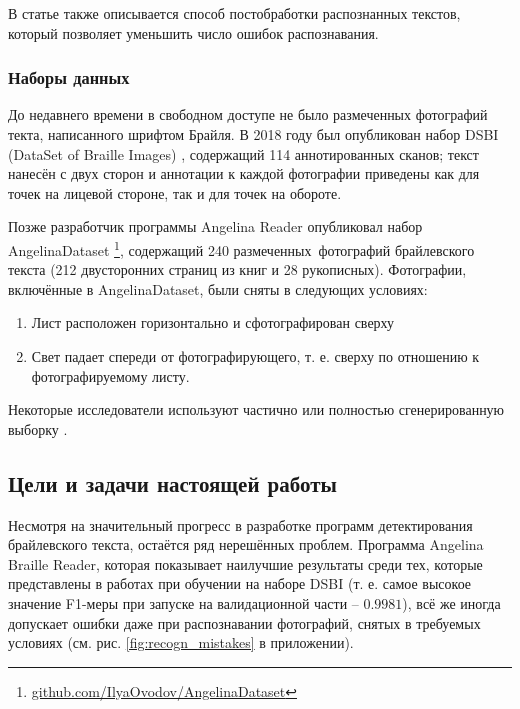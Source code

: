 \documentclass{main.tex}[subfiles]
\begin{document}
В статье \cite{ortoncelli2021} также описывается способ постобработки распознанных текстов, который позволяет уменьшить число ошибок распознавания.

\subsubsection{Наборы данных}\label{section:datas}

До недавнего времени в свободном доступе не было размеченных фотографий текта, написанного шрифтом Брайля.
В 2018 году был опубликован набор DSBI (DataSet of Braille Images) \cite{li2018dsbi}, содержащий 114 аннотированных сканов; текст нанесён с двух сторон и аннотации к каждой фотографии приведены как для точек на лицевой стороне, так и для точек на обороте.

Позже разработчик программы Angelina Reader опубликовал набор An\-ge\-li\-na\-Da\-ta\-set \footnote{\href{https://github.com/IlyaOvodov/AngelinaDataset}{github.com/IlyaOvodov/AngelinaDataset}}, содержащий 240 размеченных фотографий брайлевского текста (212 двусторонних страниц из книг и 28 рукописных).
Фотографии, включённые в AngelinaDataset, были сняты в следующих условиях:
\begin{enumerate}[noitemsep]
	\item Лист расположен горизонтально и сфотографирован сверху
	\item Свет падает спереди от фотографирующего, т. е. сверху по отношению к фотографируемому листу.
\end{enumerate}

Некоторые исследователи используют частично или полностью сгенерированную выборку \cite{baumgartner2020app, ortoncelli2021}.

\subsection{Цели и задачи настоящей работы}

Несмотря на значительный прогресс в разработке программ детектирования брайлевского текста, остаётся ряд нерешённых проблем.
Программа Angelina Braille Reader, которая показывает наилучшие результаты среди тех, которые представлены в работах \cite{li2020braunet, ovodov2020, li2018dsbi} при обучении на наборе DSBI (т. е. самое высокое значение F1-меры при запуске на валидационной части -- $0.9981$), всё же иногда допускает ошибки даже при распознавании фотографий, снятых в требуемых условиях (см. рис. \ref{fig:recogn_mistakes} в приложении).
\end{document}
